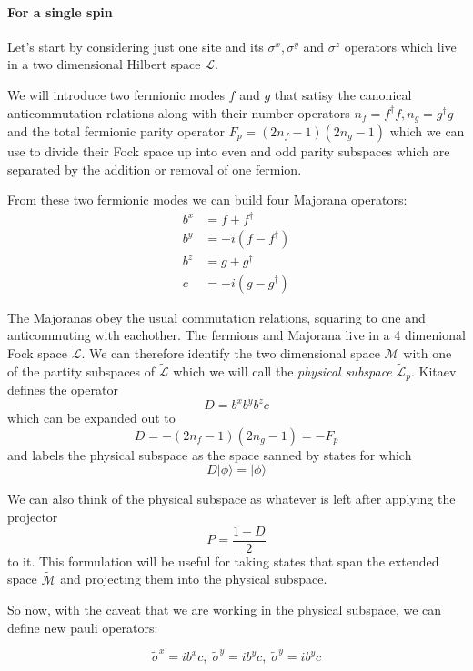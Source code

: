 \hypertarget{for-a-single-spin}{%
\paragraph{For a single spin}\label{for-a-single-spin}}

Let's start by considering just one site and its \(\sigma^x, \sigma^y\)
and \(\sigma^z\) operators which live in a two dimensional Hilbert space
\(\mathcal{L}\).

We will introduce two fermionic modes \(f\) and \(g\) that satisy the
canonical anticommutation relations along with their number operators
\(n_f = f^\dagger f, n_g = g^\dagger g\) and the total fermionic parity
operator \(F_p = (2n_f - 1)(2n_g - 1)\) which we can use to divide their
Fock space up into even and odd parity subspaces which are separated by
the addition or removal of one fermion.

From these two fermionic modes we can build four Majorana operators:
\[\begin{aligned}
b^x &= f + f^\dagger\\
b^y &= -i(f - f^\dagger)\\
b^z &= g + g^\dagger\\
c   &= -i(g - g^\dagger)
\end{aligned}\]

The Majoranas obey the usual commutation relations, squaring to one and
anticommuting with eachother. The fermions and Majorana live in a 4
dimenional Fock space \(\mathcal{\tilde{L}}\). We can therefore identify
the two dimensional space \(\mathcal{M}\) with one of the partity
subspaces of \(\mathcal{\tilde{L}}\) which we will call the
\emph{physical subspace} \(\mathcal{\tilde{L}}_p\). Kitaev defines the
operator \[D = b^xb^yb^zc\] which can be expanded out to
\[D = -(2n_f - 1)(2n_g - 1) = -F_p\] and labels the physical subspace as
the space sanned by states for which \[ D|\phi\rangle = |\phi\rangle\]

We can also think of the physical subspace as whatever is left after
applying the projector \[P  = \frac{1 - D}{2}\] to it. This formulation
will be useful for taking states that span the extended space
\(\mathcal{\tilde{M}}\) and projecting them into the physical subspace.

So now, with the caveat that we are working in the physical subspace, we
can define new pauli operators:

\[\tilde{\sigma}^x = i b^x c,\; \tilde{\sigma}^y = i b^y c,\; \tilde{\sigma}^y = i b^y c\]

